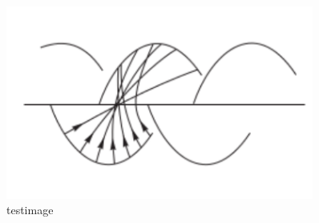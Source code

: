 \begin{figure}[h]\centering\includegraphics[width=0.9\textwidth]{../../img/testimage.pdf}\caption{testimage}\label{fig:testimage}\end{figure}
